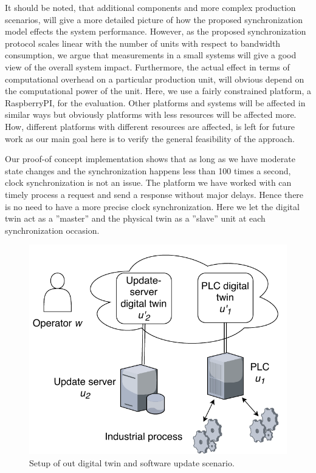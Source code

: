 It should be noted, that additional components and more complex production scenarios, will give a more detailed picture of how the proposed synchronization model effects the system performance. However, as the proposed synchronization protocol scales linear with the number of units with respect to bandwidth consumption, we argue that measurements in a small systems will give a good view of the overall system impact. Furthermore, the actual effect in terms of computational overhead on a particular production unit, will obvious depend on the computational power of the unit. Here, we use a fairly constrained platform, a RaspberryPI, for the evaluation. Other platforms and systems will be affected in similar ways but obviously platforms with less resources will be affected  more. How, different platforms with different resources are affected, is left for future work as our main goal here is to verify the general feasibility of the approach.


Our proof-of concept implementation shows that as long as we have moderate state changes and the synchronization happens less than 100 times a second, clock synchronization is not an issue. The platform we have worked with can timely process a request and send a response without major delays. Hence there is no need to have a more precise clock synchronization. Here we let the digital twin act as a ''master'' and the physical twin as a ''slave'' unit at each synchronization occasion.

\begin{figure}[ht]
   \centering
    \includegraphics[scale=0.5]{papers/digital-twin/images/FIG7_TII-19-1326}
    \caption{Setup of out digital twin and software update scenario.}
    \label{figure:setup}
\end{figure}

